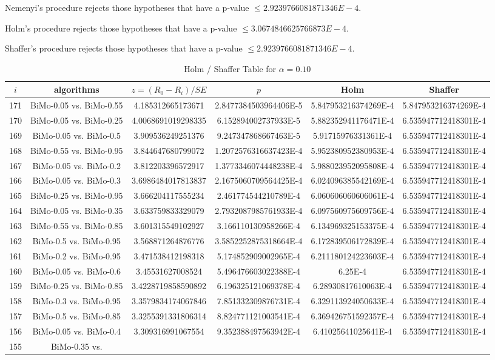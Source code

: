 \documentclass[a4paper,10pt]{article}
\begin{document}
\begin{landscape}
\begin{table}[!htp]
\begin{tabular}{cccccc}
\end{tabular}
\end{table}
Nemenyi's procedure rejects those hypotheses that have a p-value $\le2.9239766081871346E-4$.


Holm's procedure rejects those hypotheses that have a p-value $\le3.0674846625766873E-4$.


Shaffer's procedure rejects those hypotheses that have a p-value $\le2.9239766081871346E-4$.


\begin{table}[!htp]
\centering\tiny
\caption{Holm / Shaffer Table for $\alpha=0.10$}
\begin{tabular}{cccccc}
$i$&algorithms&$z=(R_0 - R_i)/SE$&$p$&Holm&Shaffer\\
\hline
171&BiMo-0.05 vs. BiMo-0.55&4.185312665173671&2.8477384503964406E-5&5.847953216374269E-4&5.847953216374269E-4\\170&BiMo-0.05 vs. BiMo-0.25&4.0068691019298335&6.152894002737933E-5&5.882352941176471E-4&6.535947712418301E-4\\169&BiMo-0.05 vs. BiMo-0.5&3.909536249251376&9.247347868667463E-5&5.91715976331361E-4&6.535947712418301E-4\\168&BiMo-0.55 vs. BiMo-0.95&3.844647680799072&1.2072576316637423E-4&5.952380952380953E-4&6.535947712418301E-4\\167&BiMo-0.05 vs. BiMo-0.2&3.812203396572917&1.3773346074448238E-4&5.988023952095808E-4&6.535947712418301E-4\\166&BiMo-0.05 vs. BiMo-0.3&3.6986484017813837&2.1675060709564425E-4&6.024096385542169E-4&6.535947712418301E-4\\165&BiMo-0.25 vs. BiMo-0.95&3.666204117555234&2.461774544210789E-4&6.060606060606061E-4&6.535947712418301E-4\\164&BiMo-0.05 vs. BiMo-0.35&3.633759833329079&2.7932087985761933E-4&6.097560975609756E-4&6.535947712418301E-4\\163&BiMo-0.55 vs. BiMo-0.85&3.601315549102927&3.166110130958266E-4&6.134969325153375E-4&6.535947712418301E-4\\162&BiMo-0.5 vs. BiMo-0.95&3.568871264876776&3.5852252875318664E-4&6.172839506172839E-4&6.535947712418301E-4\\161&BiMo-0.2 vs. BiMo-0.95&3.471538412198318&5.174852909002965E-4&6.211180124223603E-4&6.535947712418301E-4\\160&BiMo-0.05 vs. BiMo-0.6&3.45531627008524&5.496476603022388E-4&6.25E-4&6.535947712418301E-4\\159&BiMo-0.25 vs. BiMo-0.85&3.4228719858590892&6.196325121069378E-4&6.28930817610063E-4&6.535947712418301E-4\\158&BiMo-0.3 vs. BiMo-0.95&3.3579834174067846&7.851332309876731E-4&6.329113924050633E-4&6.535947712418301E-4\\157&BiMo-0.5 vs. BiMo-0.85&3.3255391331806314&8.824771121003541E-4&6.369426751592357E-4&6.535947712418301E-4\\156&BiMo-0.05 vs. BiMo-0.4&3.309316991067554&9.352388497563942E-4&6.41025641025641E-4&6.535947712418301E-4\\155&BiMo-0.35 vs. 
\end{tabular}
\end{table}
\end{landscape}
\end{document}
